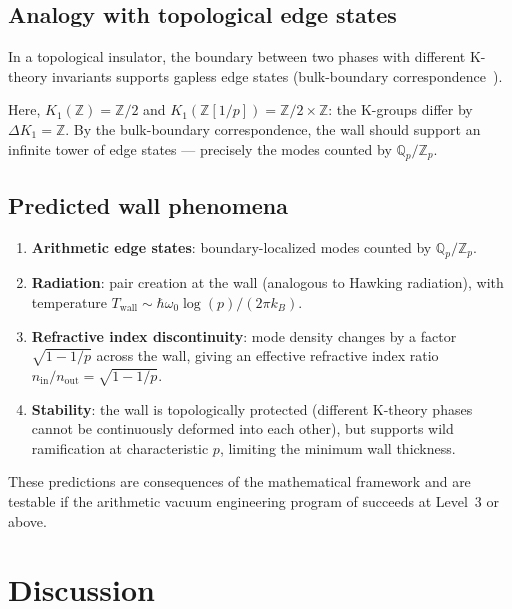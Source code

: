 \documentclass[aps,prd,twocolumn,superscriptaddress,nofootinbib]{revtex4-2}
\newcommand{\Zp}{\mathbb{Z}[1/p]}
\newcommand{\Qp}{\mathbb{Q}_p}
\begin{document}
\subsection{Analogy with topological edge states}

In a topological insulator, the boundary between two phases
with different K-theory invariants supports gapless edge
states (bulk-boundary correspondence~\cite{Kitaev2009}).

Here, $K_1(\mathbb{Z}) = \mathbb{Z}/2$ and
$K_1(\Zp) = \mathbb{Z}/2 \times \mathbb{Z}$:
the K-groups differ by $\Delta K_1 = \mathbb{Z}$.
By the bulk-boundary correspondence, the wall should support
an infinite tower of edge states --- precisely the modes
counted by $\Qp/\mathbb{Z}_p$.

\subsection{Predicted wall phenomena}

\begin{enumerate}
  \item \textbf{Arithmetic edge states}: boundary-localized modes
    counted by $\Qp/\mathbb{Z}_p$.
  \item \textbf{Radiation}: pair creation at the wall (analogous
    to Hawking radiation), with temperature
    $T_{\mathrm{wall}} \sim \hbar\omega_0 \log(p) / (2\pi k_B)$.
  \item \textbf{Refractive index discontinuity}: mode density changes
    by a factor $\sqrt{1-1/p}$ across the wall, giving an
    effective refractive index ratio $n_{\mathrm{in}}/n_{\mathrm{out}} = \sqrt{1-1/p}$.
  \item \textbf{Stability}: the wall is topologically protected
    (different K-theory phases cannot be continuously deformed
    into each other), but supports wild ramification at
    characteristic $p$, limiting the minimum wall thickness.
\end{enumerate}

These predictions are consequences of the mathematical framework
and are testable if the arithmetic vacuum engineering program of
\cite{paper_A} succeeds at Level~3 or above.

\section{Discussion}
\label{sec:discussion}
\end{document}
